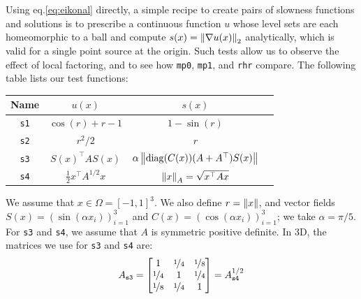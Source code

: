 \documentclass[smallcondensed]{svjour3}
\begin{document}
Using eq.\@ \ref{eq:eikonal} directly, a simple recipe to create pairs
of slowness functions and solutions is to prescribe a continuous
function $u$ whose level sets are each homeomorphic to a ball and
compute $s(x) = \left\|\nabla u(x)\right\|_2$ analytically, which is valid for
a single point source at the origin. Such tests allow us to observe
the effect of local factoring, and to see how \texttt{mp0},
\texttt{mp1}, and \texttt{rhr} compare. The following table lists our
test functions: \vspace{0.5em}
\begin{center}
  \begin{tabular}{cccc}
    Name & $u(x)$ & $s(x)$ \\
    \midrule
    \texttt{s1} & $\cos(r) + r - 1$ & $1 - \sin(r)$ \\
    \texttt{s2} & $r^2/2$ & $r$ \\
    \texttt{s3} & $S(x)^\top A S(x)$ & $\alpha\left\|\operatorname{diag}(C(x)){(A + A^\top)}S(x)\right\|$ \\
    \texttt{s4} & $\tfrac{1}{2} x^\top A^{1/2} x$ & $\left\|x\right\|_A = \sqrt{x^\top A x}$
  \end{tabular}
\end{center}
\vspace{0.5em} We assume that $x \in \Omega = [-1, 1]^3$. We also
define $r = \left\|x\right\|$, and vector fields
$S(x) = (\sin(\alpha x_i))_{i=1}^3$ and
$C(x) = (\cos(\alpha x_i))_{i=1}^3$; we take $\alpha = \pi/5$. For
\texttt{s3} and \texttt{s4}, we assume that $A$ is symmetric positive
definite. In 3D, the matrices we use for \texttt{s3} and \texttt{s4}
are:\begin{equation} A_{\texttt{s3}} = \begin{bmatrix}
    1 & \nicefrac{1}{4} & \nicefrac{1}{8} \\
    \nicefrac{1}{4} & 1 & \nicefrac{1}{4} \\
    \nicefrac{1}{8} & \nicefrac{1}{4} & 1
  \end{bmatrix} = A_{\texttt{s4}}^{1/2}
\end{equation}
\end{document}
